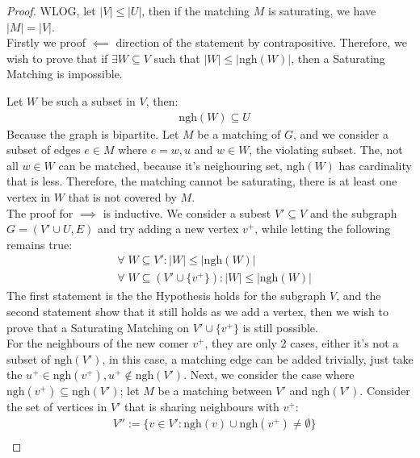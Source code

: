\documentclass[]{article}
\theoremstyle{definition}
\begin{document}
    \begin{proof}
        WLOG, let $|V|\le |U|$, then if the matching $M$ is saturating, we have $|M| = |V|$. 
        \\[1.1em]
        Firstly we proof $\impliedby$ direction of the statement by contrapositive. Therefore, we wish to prove that if $\exists W\subseteq V$ such that $|W| \le |\text{ngh}(W)|$, then a Saturating Matching is impossible. 
        \par
        Let $W$ be such a subset in $V$, then: 
        \begin{align}
            & \text{ngh}(W)\subseteq U
        \end{align}
        Because the graph is bipartite. Let $M$ be a matching of $G$, and we consider a subset of edges $e\in M$ where $e = {w, u}$ and $w \in W$, the violating subset. The, not all $w \in W$ can be matched, because it's neighouring set, $\text{ngh}(W)$ has cardinality that is less. Therefore, the matching cannot be saturating, there is at least one vertex in $W$ that is not covered by $M$. 
        \\[1.1em]
        The proof for $\implies$ is inductive. We consider a subest $V'\subseteq V$ and the subgraph $G=(V'\cup U, E)$ and try adding a new vertex $v^+$, while letting the following remains true: 
        \begin{align}
            & \forall\; W\subseteq V': |W| \le |\text{ngh}(W)|
            \\
            & \forall\;  W\subseteq (V'\cup \{v^+\}): |W| \le |\text{ngh}(W)|
        \end{align}
        The first statement is the the Hypothesis holds for the subgraph $V$, and the second statement show that it still holds as we add a vertex, then we wish to prove that a Saturating Matching on $V'\cup \{v^+\}$ is still possible. 
        \\[1.1em]
        For the neighbours of the new comer $v^+$, they are only 2 cases, either it's not a subset of $\text{ngh}(V')$, in this case, a matching edge can be added trivially, just take the $u^+\in \text{ngh}(v^+), u^+\not\in\text{ngh}(V')$. Next, we consider the case where $\text{ngh}(v^+)\subseteq \text{ngh}(V')$; let $M$ be a matching between $V'$ and $\text{ngh}(V')$. Consider the set of vertices in $V'$ that is sharing neighbours with $v^+$: 
        \begin{align}
            & V'' := \{v\in V': \text{ngh}(v)\cup \text{ngh}(v^+)\neq \emptyset\}
            \\

\end{align}
\end{proof}
\end{document}
